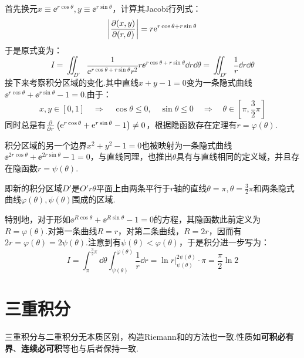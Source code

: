 \begin{solution}
    首先换元$x\equiv\ee^{r\cos\theta},y\equiv\ee^{r\sin\theta}$，计算其Jacobi行列式：
    \[\left|\pdv{(x,y)}{(r,\theta)}\right| = r\mathrm{e}^{r\cos\theta + r\sin\theta}\]
    于是原式变为：
    \[I = \iint_{D'}\frac{1}{\ee^{r\cos\theta + r\sin\theta} r^2}r\ee^{r\cos\theta + r\sin\theta}\dd{r}\dd{\theta} = \iint_{D'}\frac{1}{r}\dd{r}\dd{\theta}\]
    接下来考察积分区域的变化.其中直线$x+y-1=0$变为一条隐式曲线$\ee^{r\cos\theta} + \ee^{r\sin\theta} - 1 = 0$.由于：
    \[x,y\in[0,1] \quad\Rightarrow\quad \cos\theta\leqslant0,\quad \sin\theta\leqslant 0 \quad\Rightarrow\quad \theta\in\left[\pi,\frac{3}{2}\pi\right]\]
    同时总是有$\pdv{r}\left(\mathrm{e}^{r\cos\theta} + \mathrm{e}^{r\sin\theta} - 1\right) \neq 0$，根据隐函数存在定理有$r = \varphi(\theta)$.

    积分区域的另一个边界$x^2+y^2-1=0$也被映射为一条隐式曲线$\ee^{2r\cos\theta} + \ee^{2r\sin\theta} - 1 = 0$，与直线同理，也推出$\theta$具有与直线相同的定义域，并且存在隐函数$r = \psi(\theta)$.

    即新的积分区域$D'$是$O'r\theta$平面上由两条平行于$r$轴的直线$\theta = \pi,\theta=\frac{3}{2}\pi$和两条隐式曲线$\varphi(\theta),\psi(\theta)$围成的区域.

    特别地，对于形如$\ee^{R\cos\theta}+\ee^{R\sin\theta}-1=0$的方程，其隐函数此前定义为$R = \varphi(\theta)$.对第一条曲线$R=r$，对第二条曲线，$R = 2r$，因而有$2r = \varphi(\theta) = 2\psi(\theta)$.注意到有$\psi(\theta) < \varphi(\theta)$，于是积分进一步写为：
    \[I = \int_{\pi}^{\frac{3}{2}\pi}\dd{\theta}\int_{\psi(\theta)}^{\varphi(\theta)}\frac{1}{r}\dd{r} = \ln r\Big|_{\psi(\theta)}^{2\psi(\theta)}\cdot\pi = \frac{\pi}{2}\ln 2\]
\end{solution}


\section{三重积分}
三重积分与二重积分无本质区别，构造Riemann和的方法也一致.性质如\textbf{可积必有界}、\textbf{连续必可积}等也与后者保持一致.


